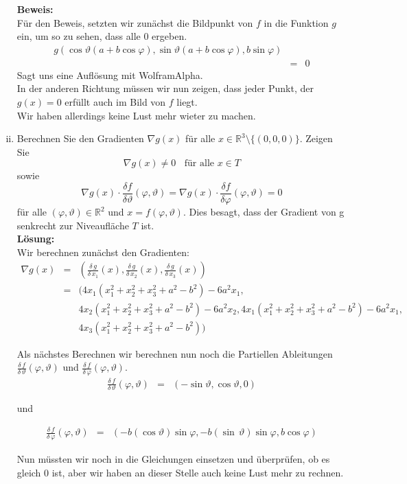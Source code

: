 \begin{enumerate}[(i)]
	\textbf{Beweis:}\\
		Für den Beweis, setzten wir zunächst die Bildpunkt von $f$ in die Funktion $g$ ein, um so zu sehen, dass alle $0$ ergeben.\\
		$$\begin{array}{rcl}
			g(\cos \vartheta (a + b \cos \varphi), \sin \vartheta ( a + b \cos \varphi), b \sin \varphi)\\
				&=& 0
		\end{array}$$
		Sagt uns eine Auflösung mit WolframAlpha.\\

		In der anderen Richtung müssen wir nun zeigen, dass jeder Punkt, der $g(x) = 0$ erfüllt auch im Bild von $f$ liegt.\\
		Wir haben allerdings keine Lust mehr wieter zu machen.
	
	\item Berechnen Sie den Gradienten $\nabla g(x)$ für alle $x \in \mathbb{R}^3 \setminus\{(0,0,0)\}$. Zeigen Sie
		$$
			\nabla g(x) \not= 0 \; \; \text{ für alle } x \in T
		$$
		sowie
		$$
			\nabla g(x) \cdot \frac{\delta f}{\delta \vartheta} (\varphi, \vartheta) = \nabla g(x) \cdot \frac{\delta f}{\delta \varphi} (\varphi, \vartheta
				) = 0
		$$
		für alle $(\varphi, \vartheta) \in \mathbb{R}^2$ und $x = f(\varphi,\vartheta)$. Dies besagt, dass der Gradient von g senkrecht
		zur Niveaufläche $T$ ist.\\
	\textbf{Lösung:}\\
		Wir berechnen zunächst den Gradienten:\\
		$$\begin{array}{rcl}
			\nabla g (x) &=& (\frac{\delta \, g}{\delta \, x_1} (x), \frac{\delta \, g}{\delta \, x_2} (x), \frac{\delta \, g}{\delta \, x_3} (x))\\
				&=& ( 4x_1(x_1^2+x_2^2+x_3^2+a^2-b^2) -6a^2x_1,   \\
			&& 4x_2(x_1^2+x_2^2+x_3^2+a^2-b^2) -6a^2x_2, 4x_1(x_1^2+x_2^2+x_3^2+a^2-b^2) -6a^2x_1,\\
			&& 4x_3(x_1^2+x_2^2+x_3^2+a^2-b^2))
		\end{array}$$

		Als nächstes Berechnen wir berechnen nun noch die Partiellen Ableitungen $\frac{\delta \, f}{\delta \, \vartheta} (\varphi,\vartheta)$ und
		$\frac{\delta \, f}{\delta \, \varphi} (\varphi,\vartheta)$.\\

		$$\begin{array}{rcl}
			\frac{\delta \, f}{\delta \, \vartheta} (\varphi,\vartheta) &=& (- \sin \vartheta, \cos \vartheta , 0)
		\end{array}$$

		und

		$$\begin{array}{rcl}
			\frac{\delta \, f}{\delta \, \varphi} (\varphi,\vartheta) &=&
				( - b (\cos \vartheta ) \sin \varphi, -b (\sin \, \vartheta) \sin \varphi, b \cos \varphi )
		\end{array}$$

		Nun müssten wir noch in die Gleichungen einsetzen und überprüfen, ob es gleich 0 ist, aber wir haben an dieser Stelle auch keine Lust
		mehr zu rechnen.
\end{enumerate}